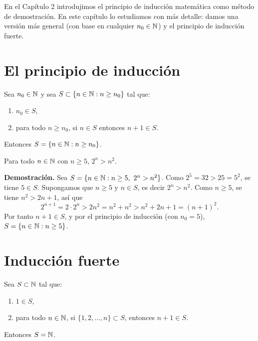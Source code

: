 \documentclass[12pt,a4paper]{book}
\begin{document}
    En el Capítulo 2 introdujimos el principio de inducción matemática como método de demostración. En este capítulo lo estudiamos con más detalle: damos una versión más general (con base en cualquier $n_0\in\mathbb{N}$) y el principio de inducción fuerte.

    \section{El principio de inducción}

    \begin{proposicion}
        Sea $n_0\in\mathbb{N}$ y sea $S \subset \{n\in\mathbb{N} : n\ge n_0\}$ tal que:
        \begin{enumerate}[label=(\alph*)]
            \item $n_0 \in S$,
            \item para todo $n\ge n_0$, si $n\in S$ entonces $n+1\in S$.
        \end{enumerate}
        Entonces $S=\{n\in\mathbb{N} : n\ge n_0\}$.
    \end{proposicion}

    \begin{ejemplo}
        Para todo $n\in\mathbb{N}$ con $n\ge 5$, $2^n > n^2$.

        \textbf{Demostración.} Sea $S=\{n\in\mathbb{N} : n\ge 5,\ 2^n>n^2\}$. Como $2^5=32>25=5^2$, se tiene $5\in S$. Supongamos que $n\ge 5$ y $n\in S$, es decir $2^n>n^2$. Como $n\ge5$, se tiene $n^2>2n+1$, así que
        \begin{equation*}
            2^{n+1} = 2\cdot 2^n > 2n^2 = n^2+n^2 > n^2+2n+1 = (n+1)^2.
        \end{equation*}
        Por tanto $n+1\in S$, y por el principio de inducción (con $n_0=5$), $S=\{n\in\mathbb{N} : n\ge5\}$.
    \end{ejemplo}

    \section{Inducción fuerte}

    \begin{proposicion}
        Sea $S\subset\mathbb{N}$ tal que:
        \begin{enumerate}[label=(\alph*)]
            \item $1\in S$,
            \item para todo $n\in\mathbb{N}$, si $\{1,2,\dots,n\}\subset S$, entonces $n+1\in S$.
        \end{enumerate}
        Entonces $S=\mathbb{N}$.
    \end{proposicion}
\end{document}
